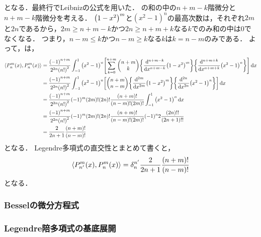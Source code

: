 \documentclass{report}
\begin{document}
      となる．最終行でLeibnizの公式を用いた．
      の和の中の$n + m - k$階微分と$n + m - k$階微分を考える．
      $\qty(1 - x^2)^m$と$(x^2 - 1)^n$の最高次数は，それぞれ$2m$と$2n$であるから，$2m \geq n + m - k$かつ$2n \geq n + m + k$なる$k$でのみ和の中は0でなくなる．
      つまり，$n - m\leq k$かつ$n - m \geq k$なる$k$は$k = n - m$のみである．
      よって，は，
      \begin{align}
        \inner{P_{n}^m(x)}{P_{n}^m(x)} &= \frac{\qty(-1)^{n + m}}{2^{2n}\qty(n!)^2}\int_{-1}^{1}\qty(x^2 - 1)^n\qty[\sum_{k = 0}^{n + m}\mqty(n + m \\ k)\qty{\dv[n + m - k]{x}\qty(1 - x^2)^m}\qty{\dv[n + m + k]{x}\qty(x^2 - 1)^n}] \dd{x} \\ 
        &= \frac{\qty(-1)^{n + m}}{2^{2n}\qty(n!)^2}\int_{-1}^{1}\qty(x^2 - 1)^n\qty[\mqty(n + m \\ n - m)\qty{\dv[2m]{x}\qty(1 - x^2)^m}\qty{\dv[2n]{x}\qty(x^2 - 1)^n}] \dd{x} \\ 
        &= \frac{\qty(-1)^{n + m}}{2^{2n}\qty(n!)^2}(-1)^m\qty(2m)!\qty(2n)!\frac{(n + m)!}{(n - m)!(2m)!}\int_{-1}^{1}\qty(x^2 - 1)^n\dd{x} \\ 
        &= \frac{\qty(-1)^{n + m}}{2^{2n}\qty(n!)^2}(-1)^m\qty(2m)!\qty(2n)!\frac{(n + m)!}{(n - m)!(2m)!}(-1)^n2\frac{(2n)!!}{(2n + 1)!!} \\ 
        &= \frac{2}{2n + 1}\frac{(n + m)!}{(n - m)!}
      \end{align}
      となる．
      Legendre多項式の直交性とまとめて書くと，
      \begin{align}
        \left\langle P_{n'}^m(x), P_{n}^m(x) \right\rangle = \delta_{n}^{n'}\frac{2}{2n + 1}\frac{(n + m)!}{(n - m)!}\label{pnm-norm}
      \end{align}
      となる．
    \subsubsection{Besselの微分方程式}
    \subsubsection{Legendre陪多項式の基底展開}
\end{document}

